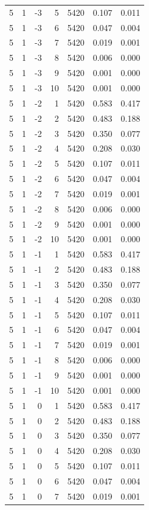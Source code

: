 \begin{table}
\begin{tabular}{rrrrrrr}
5 & 1 & -3 & 5 & 5420 & 0.107 & 0.011 \\
5 & 1 & -3 & 6 & 5420 & 0.047 & 0.004 \\
5 & 1 & -3 & 7 & 5420 & 0.019 & 0.001 \\
5 & 1 & -3 & 8 & 5420 & 0.006 & 0.000 \\
5 & 1 & -3 & 9 & 5420 & 0.001 & 0.000 \\
5 & 1 & -3 & 10 & 5420 & 0.001 & 0.000 \\
5 & 1 & -2 & 1 & 5420 & 0.583 & 0.417 \\
5 & 1 & -2 & 2 & 5420 & 0.483 & 0.188 \\
5 & 1 & -2 & 3 & 5420 & 0.350 & 0.077 \\
5 & 1 & -2 & 4 & 5420 & 0.208 & 0.030 \\
5 & 1 & -2 & 5 & 5420 & 0.107 & 0.011 \\
5 & 1 & -2 & 6 & 5420 & 0.047 & 0.004 \\
5 & 1 & -2 & 7 & 5420 & 0.019 & 0.001 \\
5 & 1 & -2 & 8 & 5420 & 0.006 & 0.000 \\
5 & 1 & -2 & 9 & 5420 & 0.001 & 0.000 \\
5 & 1 & -2 & 10 & 5420 & 0.001 & 0.000 \\
5 & 1 & -1 & 1 & 5420 & 0.583 & 0.417 \\
5 & 1 & -1 & 2 & 5420 & 0.483 & 0.188 \\
5 & 1 & -1 & 3 & 5420 & 0.350 & 0.077 \\
5 & 1 & -1 & 4 & 5420 & 0.208 & 0.030 \\
5 & 1 & -1 & 5 & 5420 & 0.107 & 0.011 \\
5 & 1 & -1 & 6 & 5420 & 0.047 & 0.004 \\
5 & 1 & -1 & 7 & 5420 & 0.019 & 0.001 \\
5 & 1 & -1 & 8 & 5420 & 0.006 & 0.000 \\
5 & 1 & -1 & 9 & 5420 & 0.001 & 0.000 \\
5 & 1 & -1 & 10 & 5420 & 0.001 & 0.000 \\
5 & 1 & 0 & 1 & 5420 & 0.583 & 0.417 \\
5 & 1 & 0 & 2 & 5420 & 0.483 & 0.188 \\
5 & 1 & 0 & 3 & 5420 & 0.350 & 0.077 \\
5 & 1 & 0 & 4 & 5420 & 0.208 & 0.030 \\
5 & 1 & 0 & 5 & 5420 & 0.107 & 0.011 \\
5 & 1 & 0 & 6 & 5420 & 0.047 & 0.004 \\
5 & 1 & 0 & 7 & 5420 & 0.019 & 0.001 \\

\end{tabular}
\end{table}
